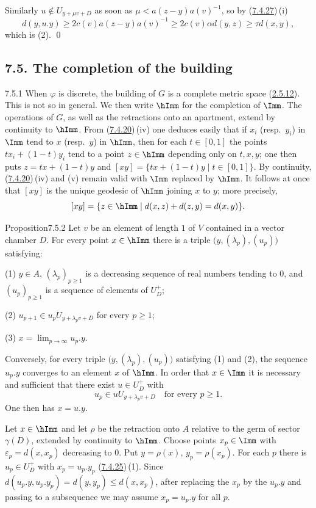 \documentclass[12pt,a4paper,oneside,english]{smfart}
\makeatletter
\newcommand{\btanchor}[1]{\leavevmode\Hy@raisedlink{\hypertarget{bt:#1}{}}}
\newcommand{\btref}[1]{\hyperlink{bt:#1}{#1}}
\newcommand{\btsecB}[2]{%
  \par\needspace{4\baselineskip}\phantomsection
  \subsection*{#2}%
  \ifx\relax#1\relax\else\btanchor{#1}\fi}
\theoremstyle{definition}
\theoremstyle{bt}
\makeatother
\begin{document}
Similarly $u\notin U_{y+\mu v+D}$ as soon as $\mu<a(z-y)a(v)^{-1}$, so by
(\btref{7.4.27})\,(i)
\[
  d(y,u.y)\geqslant2c(v)a(z-y)a(v)^{-1}\geqslant2c(v)\alpha d(y,z)\geqslant\tau d(x,y),
\]
which is (2). \qed

\btsecB{7.5}{7.5. The completion of the building}

\num{7.5.1}\btanchor{7.5.1} When $\varphi$ is discrete, the building of $G$ is a complete metric
space (\btref{2.5.12}). This is not so in general. We then write $\hImm$ for the completion
of $\Imm$. The operations of $G$, as well as the retractions onto an apartment,
extend by continuity to $\hImm$. From (\btref{7.4.20})\,(iv) one deduces easily that if
$x_i$ (resp.\ $y_i$) in $\Imm$ tend to $x$ (resp.\ $y$) in $\hImm$, then for each
$t\in[0,1]$ the points $tx_i+(1-t)y_i$ tend to a point $z\in\hImm$ depending only on
$t,x,y$; one then puts $z=tx+(1-t)y$ and $[xy]=\{tx+(1-t)y\mid t\in[0,1]\}$. By
continuity, (\btref{7.4.20})\,(iv) and (v) remain valid with $\Imm$ replaced by $\hImm$. It
follows at once that $[xy]$ is the unique geodesic of $\hImm$ joining $x$ to $y$;
more precisely,
\[
  [xy]=\{z\in\hImm\mid d(x,z)+d(z,y)=d(x,y)\}.
\]

\begin{stmt}{Proposition}{7.5.2}\btanchor{7.5.2}
Let $v$ be an element of length $1$ of $V$ contained in a vector chamber $D$. For
every point $x\in\hImm$ there is a triple $\bigl(y,(\lambda_p),(u_p)\bigr)$
satisfying:

\quad\textup{(1)} $y\in A$, $(\lambda_p)_{p\geqslant1}$ is a decreasing sequence of
real numbers tending to $0$, and $(u_p)_{p\geqslant1}$ is a sequence of elements of
$U_D^{+}$;

\quad\textup{(2)} $u_{p+1}\in u_pU_{y+\lambda_pv+D}$ for every $p\geqslant1$;

\quad\textup{(3)} $x=\lim_{p\to\infty}u_p.y$.

\noindent Conversely, for every triple $\bigl(y,(\lambda_p),(u_p)\bigr)$ satisfying
\textup{(1)} and \textup{(2)}, the sequence $u_p.y$ converges to an element $x$ of
$\hImm$. In order that $x\in\Imm$ it is necessary and sufficient that there exist
$u\in U_D^{+}$ with
\begin{equation}
  u_p\in uU_{y+\lambda_pv+D}\quad\text{for every }p\geqslant1. \tag{4}
\end{equation}
One then has $x=u.y$.
\end{stmt}

\pf Let $x\in\hImm$ and let $\rho$ be the retraction onto $A$ relative to the germ
of sector $\gamma(D)$, extended by continuity to $\hImm$. Choose points
$x_p\in\Imm$ with $\varepsilon_p=d(x,x_p)$ decreasing to $0$. Put $y=\rho(x)$,
$y_p=\rho(x_p)$. For each $p$ there is $u_p\in U_D^{+}$ with $x_p=u_p.y_p$
(\btref{7.4.25})\,(1). Since $d(u_p.y,u_p.y_p)=d(y,y_p)\leqslant d(x,x_p)$, after replacing
the $x_p$ by the $u_p.y$ and passing to a subsequence we may assume $x_p=u_p.y$ for
all $p$.
\end{document}
